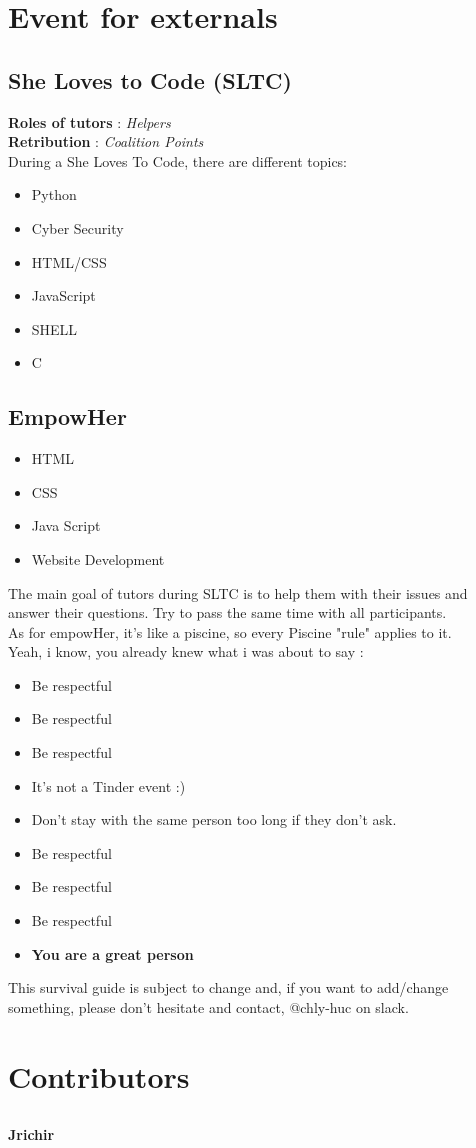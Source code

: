 \documentclass{article}
\begin{document}
\section{Event for externals}


\subsection{She Loves to Code (SLTC)}
\textbf{Roles of tutors} : \textit{Helpers} \\
\textbf{Retribution} : \textit{Coalition Points} \\ 
During a She Loves To Code, there are different topics:
\begin{itemize}
    \item Python
    \item Cyber Security
    \item HTML/CSS
    \item JavaScript
    \item SHELL
    \item C
\end{itemize}

\subsection{EmpowHer}

\begin{itemize}
    \item HTML
    \item CSS
    \item Java Script
    \item Website Development
\end{itemize}


The main goal of tutors during SLTC is to help them with their issues and answer their questions. Try to pass the same time with all participants. \\
As for empowHer, it's like a piscine, so every Piscine "rule" applies to it.
\\
Yeah, i know, you already knew what i was about to say :
\begin{itemize}
    \item Be respectful
    \item Be respectful
    \item Be respectful
    \item It's not a Tinder event :)
    \item Don't stay with the same person too long if they don't ask.
    \item Be respectful
    \item Be respectful
    \item Be respectful
    \item \textbf{You are a great person}
\end{itemize}

\clearpage


This survival guide is subject to change and, if you want to add/change something, please don't hesitate and contact, @chly-huc on slack.


\section{Contributors}
\subsection{}
\textbf{Jrichir}
\end{document}
